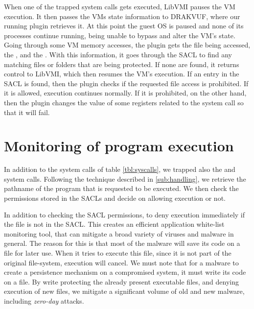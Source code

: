 \par When one of the trapped system calls gets executed, LibVMI pauses the \ac{VM} execution. It then passes the \ac{VM}s state information to DRAKVUF, where our running plugin retrieves it. At this point the guest \ac{OS} is paused and none of its processes continue running, being unable to bypass and alter the \ac{VM}'s state. Going through some \ac{VM} memory accesses, the plugin gets the file being accessed, the , and the . With this information, it goes through the \ac{SACL} to find any matching files or folders that are being protected. If none are found, it returns control to LibVMI, which then resumes the \ac{VM}'s execution. If an entry in the \ac{SACL} is found, then the plugin checks if the requested file access is prohibited. If it is allowed, execution continues normally. If it is prohibited, on the other hand, then the plugin changes the value of some registers related to the system call so that it will fail.


\section{Monitoring of program execution}

\par In addition to the system calls of table \ref{tbl:syscalls}, we trapped also the  and  system calls. Following the technique described in \ref{sub:handling}, we retrieve the pathname of the program that is requested to be executed. We then check the permissions stored in the \acp{SACL} and decide on allowing execution or not.

\par In addition to checking the \ac{SACL} permissions, to deny execution immediately if the file is not in the \ac{SACL}. This creates an efficient application white-list monitoring tool, that can mitigate a broad variety of viruses and malware in general. The reason for this is that most of the malware will save its code on a file for later use. When it tries to execute this file, since it is not part of the original file-system, execution will cancel. We must note that for a malware to create a persistence mechanism on a compromised system, it must write its code on a file. By write protecting the already present executable files, and denying execution of new files, we mitigate a significant volume of old and new malware, including \emph{zero-day} attacks.



